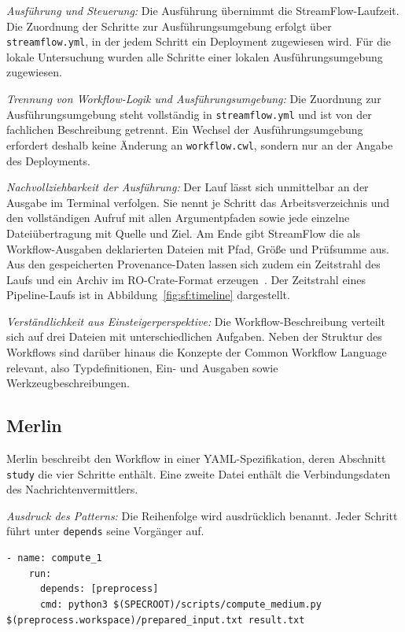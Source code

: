 \emph{Ausführung und Steuerung:} Die Ausführung übernimmt die
StreamFlow-Laufzeit. Die Zuordnung der Schritte zur
Ausführungsumgebung erfolgt über \texttt{streamflow.yml}, in der
jedem Schritt ein Deployment zugewiesen wird. Für die lokale
Untersuchung wurden alle Schritte einer lokalen Ausführungsumgebung
zugewiesen.

\emph{Trennung von Workflow-Logik und Ausführungsumgebung:} Die
Zuordnung zur Ausführungsumgebung steht vollständig in
\texttt{streamflow.yml} und ist von der fachlichen Beschreibung
getrennt. Ein Wechsel der Ausführungsumgebung erfordert deshalb keine
Änderung an \texttt{workflow.cwl}, sondern nur an der Angabe des
Deployments.


\emph{Nachvollziehbarkeit der Ausführung:} Der Lauf lässt sich
unmittelbar an der Ausgabe im Terminal verfolgen. Sie nennt je Schritt
das Arbeitsverzeichnis und den vollständigen Aufruf mit allen
Argumentpfaden sowie jede einzelne Dateiübertragung mit Quelle und
Ziel. Am Ende gibt StreamFlow die als Workflow-Ausgaben deklarierten
Dateien mit Pfad, Größe und Prüfsumme aus. Aus den gespeicherten
Provenance-Daten lassen sich zudem ein Zeitstrahl des Laufs und ein
Archiv im RO-Crate-Format erzeugen~\cite{streamflowdocs-inspect}. Der
Zeitstrahl eines Pipeline-Laufs ist in
Abbildung~\ref{fig:sf:timeline} dargestellt.

\emph{Verständlichkeit aus Einsteigerperspektive:} Die
Workflow-Beschreibung verteilt sich auf drei Dateien mit
unterschiedlichen Aufgaben. Neben der Struktur des Workflows sind
darüber hinaus die Konzepte der Common Workflow Language relevant,
also Typdefinitionen, Ein- und Ausgaben sowie
Werkzeugbeschreibungen.

\subsection{Merlin}
\label{sec:lokal:pipeline:merlin}

Merlin beschreibt den Workflow in einer YAML-Spezifikation, deren
Abschnitt \texttt{study} die vier Schritte enthält. Eine zweite Datei
enthält die Verbindungsdaten des Nachrichtenvermittlers.

\emph{Ausdruck des Patterns:} Die Reihenfolge wird ausdrücklich
benannt. Jeder Schritt führt unter \texttt{depends} seine Vorgänger
auf.

\begin{lstlisting}[caption={Abhängigkeit und Datenweitergabe eines Schritts (Merlin, Pipeline)},label={lst:pipe:me}]
  - name: compute_1
    run:
      depends: [preprocess]
      cmd: python3 $(SPECROOT)/scripts/compute_medium.py $(preprocess.workspace)/prepared_input.txt result.txt
\end{lstlisting}

